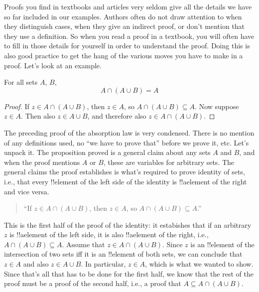 \documentclass[../../../include/open-logic-section]{subfiles}
\begin{document}

Proofs you find in textbooks and articles very seldom give all the
details we have so far included in our examples. Authors often do not
draw attention to when they distinguish cases, when they give an
indirect proof, or don't mention that they use a definition.  So when
you read a proof in a textbook, you will often have to fill in those
details for yourself in order to understand the proof. Doing this is
also good practice to get the hang of the various moves you have to
make in a proof. Let's look at an example.

\begin{prop}[Absorption]
For all sets $A$, $B$,
\[
A \cap (A \cup B) = A
\]
\end{prop}

\begin{proof}
If $z \in A \cap (A \cup B)$, then $z \in A$, so $A \cap (A \cup B)
\subseteq A$. Now suppose $z \in A$. Then also $z \in A \cup B$, and
therefore also $z \in A \cap (A \cup B)$.
\end{proof}

The preceding proof of the absorption law is very condensed. There is
no mention of any definitions used, no ``we have to prove that''
before we prove it, etc. Let's unpack it.  The proposition proved is a
general claim about any sets $A$ and $B$, and when the proof mentions
$A$ or $B$, these are variables for arbitrary sets.  The general
claims the proof establishes is what's required to prove identity of
sets, i.e., that every !!{element} of the left side of the identity is
!!a{element} of the right and vice versa.  

\begin{quote}
``If $z \in A \cap (A \cup B)$, then $z \in A$, so $A \cap (A \cup B)
  \subseteq A$.''
\end{quote}

This is the first half of the proof of the identity: it estabishes
that if an arbitrary~$z$ is !!a{element} of the left side, it is also
!!a{element} of the right, i.e., $A \cap (A \cup B) \subseteq A$.
Assume that $z \in A \cap (A \cup B)$. Since $z$ is an !!{element} of
the intersection of two sets iff it is an !!{element} of both sets, we
can conclude that $z \in A$ and also $z \in A \cup B$. In particular,
$z \in A$, which is what we wanted to show.  Since that's all that has
to be done for the first half, we know that the rest of the proof must
be a proof of the second half, i.e., a proof that $A \subseteq A \cap
(A \cup B)$.
\end{document}
